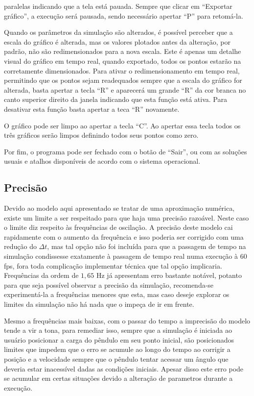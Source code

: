 \documentclass[12pt]{article}
\begin{document}
    paralelas indicando que a tela está pauada. Sempre que clicar em ``Exportar gráfico'', a execução será pausada, sendo necessário
    apertar ``P'' para retomá-la.
    \par Quando os parâmetros da simulação são alterados, é possível perceber que a escala do gráfico é alterada, mas os valores
    plotados antes da alteração, por padrão, não são redimensionados para a nova escala. Este é apenas um detalhe visual do gráfico 
    em tempo real, quando exportado, todos os pontos estarão na corretamente dimensionados. Para ativar o redimensionamento em tempo
    real, permitindo que os pontos sejam readequados sempre que a escala do gráfico for alterada, basta apertar a tecla ``R'' e aparecerá
    um grande ``R'' da cor branca no canto superior direito da janela indicando que esta função está ativa. Para desativar esta função basta
    apertar a teca ``R'' novamente.
    \par O gráfico pode ser limpo ao apertar a tecla ``C''. Ao apertar essa tecla todos os três gráficos serão limpos definindo todos seus
    pontos como zero.
    \par Por fim, o programa pode ser fechado com o botão de ``Sair'', ou com as soluções usuais e atalhos disponíveis de acordo com o sistema
    operacional.
    \subsection*{Precisão}
    Devido ao modelo aqui apresentado se tratar de uma aproximação numérica, existe um limite a ser respeitado para que haja uma precisão
    razoável. Neste caso o limite diz respeito às frequências de oscilação. A precisão deste modelo cai rapidamente com o aumento da frequência e isso
    poderia ser corrigido com uma redução do $\Delta t$, mas tal opção não foi incluída para que a passagem de tempo na simulação condissesse exatamente
    à passagem de tempo real numa execução à 60 fps, fora toda complicação implementar técnica que tal opção implicaria. Frequências da ordem de $1,65$ Hz 
    já apresentam erro bastante notável, potanto para que seja possível observar a precisão da simulação, recomenda-se experimentá-la a frequências menores 
    que esta, mas caso deseje explorar os limites da simulação não há nada que o impeça de ir em frente.
    \par Mesmo a frequências mais baixas, com o passar do tempo a imprecisão do modelo tende a vir a tona, para remediar isso, sempre que a simulação é iniciada
    ao usuário posicionar a carga do pêndulo em seu ponto inicial, são posicionados limites que impedem que o erro se acumule ao longo do tempo ao corrigir
    a posição e a velocidade sempre que o pêndulo tentar acessar um ângulo que deveria estar inacessível dadas as condições iniciais. Apesar disso 
    este erro pode se acumular em certas situações devido a alteração de parametros durante a execução.
    \newpage
    \nocite{Marion}
    \nocite{medeiros_2016}
    
    
\end{document}
